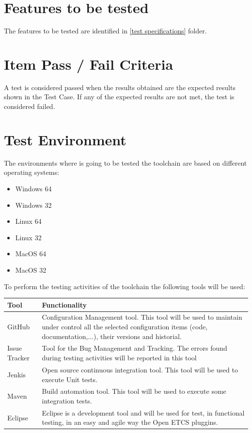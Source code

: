 \section{Features to be tested}
\label{sec:features_test}

The features to be tested are identified in \href{https://github.com/openETCS/toolchain/tree/master/tool/bundles}{[test specifications]} folder.


\section{Item Pass / Fail Criteria}
A test is considered passed when the results obtained are the expected results shown in the Test Case. If any of the expected results are not met, the test is considered failed.

\section{Test Environment}
The environments where is going to be tested the toolchain are based on different operating systems:
\begin{itemize}
\item Windows 64
\item Windows 32
\item Linux 64
\item Linux 32
\item MacOS 64
\item MacOS 32
\end{itemize}

To perform the testing activities of the toolchain the following tools will be used:

\begin{center}
\begin{longtable}{|p{2cm}|p{8cm}|}\hline
\textbf{Tool} & \textbf{Functionality}\\\hline
GitHub & Configuration Management tool. This tool will be used to maintain under control all the selected configuration items (code, documentation,...), their versions and historial.\\\hline
Issue Tracker & Tool for the Bug Management and Tracking. The errors found during testing activities will be reported in this tool\\\hline
Jenkis & Open source continuous integration tool. This tool will be used to execute Unit tests.\\\hline
Maven &  Build automation tool. This tool will be used to execute some integration tests.\\\hline
Eclipse & Eclipse is a development tool and will be used for test, in functional testing, in an easy and agile way the Open ETCS pluggins.\\\hline
\end{longtable}
\end{center}

